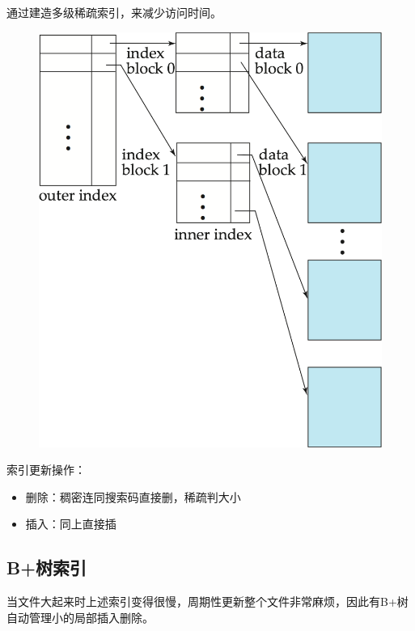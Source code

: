 通过建造多级稀疏索引，来减少访问时间。
\begin{figure}[H]
\centering
\includegraphics[width=0.5\linewidth]{fig/multilevel-index.png}
\end{figure}

索引更新操作：
\begin{itemize}
	\item 删除：稠密连同搜索码直接删，稀疏判大小
	\item 插入：同上直接插
\end{itemize}

\subsection{B+树索引}
当文件大起来时上述索引变得很慢，周期性更新整个文件非常麻烦，因此有B+树自动管理小的局部插入删除。

